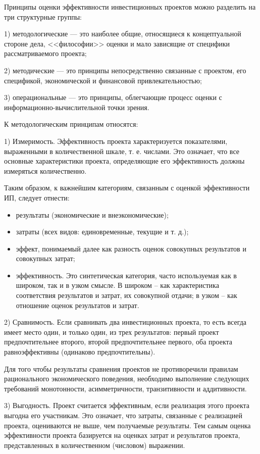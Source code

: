 Принципы оценки эффективности инвестиционных проектов можно разделить на три структурные группы:

1) методологические --- это наиболее общие, относящиеся к концептуальной стороне дела, <<философии>> оценки и мало зависящие от специфики рассматриваемого проекта;

2) методические --- это принципы непосредственно связанные с проектом, его спецификой, экономической и финансовой привлекательностью;

3) операциональные --- это принципы, облегчающие процесс оценки с информационно-вычислительной точки зрения.

К методологическим принципам относятся:

1) Измеримость.
Эффективность проекта характеризуется показателями, выраженными в количественной шкале, т. е. числами.
Это означает, что все основные характеристики проекта, определяющие его эффективность должны измеряться количественно.

Таким образом, к важнейшим категориям, связанным с оценкой эффективности ИП, следует отнести:
\begin{itemize}
	\setlength\itemsep{0pt}
 \item результаты (экономические и внеэкономические);
\item затраты (всех видов: единовременные, текущие и т. д.);
\item эффект, понимаемый далее как разность оценок совокупных результатов и совокупных затрат;
\item эффективность. Это синтетическая категория, часто используемая как в широком, так и в узком смысле. В широком – как характеристика соответствия результатов и затрат, их совокупной отдачи; в узком – как отношение оценок результатов и затрат.
\end{itemize}

2) Сравнимость.
Если сравнивать два инвестиционных проекта, то есть всегда имеет место один, и только один, из трех результатов: первый проект предпочтительнее второго, второй предпочтительнее первого, оба проекта равноэффективны (одинаково предпочтительны).

Для того чтобы результаты сравнения проектов не противоречили правилам рационального экономического поведения, необходимо выполнение следующих требований монотонности, асимметричности, транзитивности и аддитивности.

3) Выгодность.
Проект считается эффективным, если реализация этого проекта выгодна его участникам.
Это означает, что затраты, связанные с реализацией проекта, оцениваются не выше, чем получаемые результаты.
Тем самым оценка эффективности проекта базируется на оценках затрат и результатов проекта, представленных в количественном (числовом) выражении.

